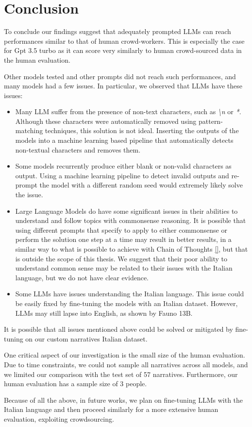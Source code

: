\chapter{Conclusion}
\label{cha:conclusion}
To conclude our findings suggest that adequately prompted LLMs can reach performances similar to that of human crowd-workers. This is especially the case for Gpt 3.5 turbo as it can score very similarly to human crowd-sourced data in the human evaluation.

Other models tested and other prompts did not reach such performances, and many models had a few issues. In particular, we observed that LLMs have these issues:
\begin{itemize}
    \item Many LLM suffer from the presence of non-text characters, such as \emph{\textbackslash n} or \emph{*}. Although these characters were automatically removed using pattern-matching techniques, this solution is not ideal. Inserting the outputs of the models into a machine learning based pipeline that automatically detects non-textual characters and removes them.
    \item Some models recurrently produce either blank or non-valid characters as output. Using a machine learning pipeline to detect invalid outputs and re-prompt the model with a different random seed would extremely likely solve the issue.
    \item Large Language Models do have some significant issues in their abilities to understand and follow topics with commonsense reasoning. It is possible that using different prompts that specify to apply to either commonsense or perform the solution one step at a time may result in better results, in a similar way to what is possible to achieve with Chain of Thoughts \ref{}, but that is outside the scope of this thesis. We suggest that their poor ability to understand common sense may be related to their issues with the Italian language, but we do not have clear evidence.
    \item Some LLMs have issues understanding the Italian language. This issue could be easily fixed by fine-tuning the models with an Italian dataset. However, LLMs may still lapse into English, as shown by Fauno 13B.
\end{itemize}
It is possible that all issues mentioned above could be solved or mitigated by fine-tuning on our custom narratives Italian dataset.

One critical aspect of our investigation is the small size of the human evaluation. Due to time constraints, we could not sample all narratives across all models, and we limited our comparison with the test set of 57 narratives. Furthermore, our human evaluation has a sample size of 3 people.  

Because of all the above, in future works, we plan on fine-tuning LLMs with the Italian language and then proceed similarly for a more extensive human evaluation, exploiting crowdsourcing. 